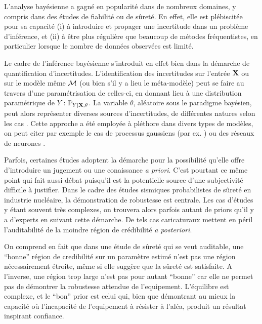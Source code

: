 L'analyse bayésienne a gagné en popularité dans de nombreux domaines, y compris dans des études de fiabilité ou de sûreté. 
En effet, elle est plébiscitée pour sa capacité (i) à introduire et propager une incertitude dans un problème d'inférence, et (ii) à être plus régulière que beaucoup de métodes fréquentistes, en particulier lorsque le nombre de données observées est limité.

Le cadre de l'inférence bayésienne s'introduit en effet bien dans la démarche de quantification d'incertitudes. 
L'identification des incertitudes sur l'entrée $\mathbf{X}$ ou sur le modèle même $\mathcal{M}$ (ou bien s'il y a lieu le méta-modèle) peut se faire au travers d'une paramétrisation de celles-ci, en donnant lieu à une distribution paramétrique de $Y$ : $\mathbb{P}_{Y|\mathbf{X},\theta}$.
La variable $\theta$, aléatoire sous le paradigme bayésien, peut alors représenter diverses sources d'incertitudes, de différentes natures selon les cas \citep{bousquet_contributions_2024}. Cette approche a été employée à pléthore dans divers types de modèles, on peut citer par exemple le cas de processus gaussiens (par ex. \cite{gu_parallel_2016}) ou des réseaux de neurones \citep{arbel_bayes_2023}. 



Parfois, certaines études adoptent la démarche pour la possibilité qu'elle offre d'introduire un jugement  ou une conaissance \emph{a priori}.
C'est pourtant ce même point qui fait aussi débat puisqu'il est la potentielle source d'une subjectivité difficile à justifier.
Dans le cadre des études sismiques probabilistes de sûreté en industrie nucléaire, la démonstration de robustesse est centrale. Les cas d'études y étant souvent très complexes, on trouvera alors parfois autant de priors qu'il y a d'experts en suivant cette démarche.
De tels cas caricaturaux mettent en péril l'auditabilité de la moindre région de crédibilité \emph{a posteriori}.


On comprend en fait que dans une étude de sûreté qui se veut auditable, une ``bonne'' région de credibilité sur un paramètre estimé n'est pas une région nécessairement étroite, même si elle suggère que la sûreté est satisfaite. A l'inverse, une région trop large n'est pas pour autant ``bonne'' car elle ne permet pas de démontrer la robustesse attendue de l'equipement. L'équilibre est complexe, et le ``bon'' prior est celui qui, bien que démontrant au mieux la capacité où l'incapacité de l'equipement à résister à l'aléa, produit un résultat inspirant confiance. %

